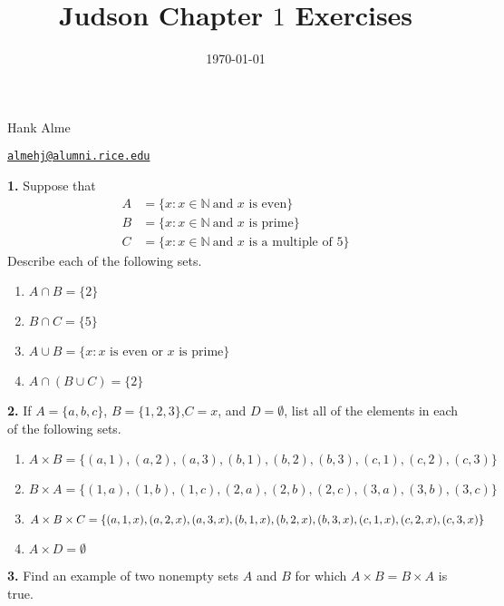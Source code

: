 \documentclass[12pt]{amsart}
\title{Judson Chapter $1$ Exercises}
\date{\today}
\newenvironment{statement}[1]{\smallskip\noindent\color[rgb]{1.00,0.00,0.50} {\bf #1.}}{}
\theoremstyle{definition}
\theoremstyle{remark}
\newcommand{\BN}{\mathbb N}
\begin{document}
\maketitle

\vspace*{-0.25in}
\centerline{Hank Alme}
\centerline{\href{mailto:almehj@alumni.rice.edu}{{\tt almehj@alumni.rice.edu}}}
\vspace*{0.15in}


\begin{statement}{1}
  Suppose that
  \begin{align*}
    A &= \{ x : x \in \BN\  \text{and $x$ is even} \} \\
    B &= \{ x : x \in \BN\  \text{and $x$ is prime} \} \\
    C &= \{ x : x \in \BN\  \text{and $x$ is a multiple of $5$} \}
  \end{align*}
  Describe each of the following sets.
  
\end{statement}
\begin{enumerate}[label=(\alph*)]
\item $A \cap B = \{2\}$
\item $B \cap C = \{5\}$
\item $A \cup B = \{ x : \text{$x$ is even or $x$ is prime} \}$
\item $A \cap (B \cup C) = \{2\}$
\end{enumerate}


\begin{statement}{2}
  If $A = \{a,b,c\}$, $B = \{1,2,3\}$,$C= {x}$, and $D = \emptyset$,
  list all of the elements in each of the following sets.
\end{statement}

\begin{enumerate}[label=(\alph*)]
  \item $A \times B =
    \{(a,1),(a,2),(a,3),(b,1),(b,2),(b,3),(c,1),(c,2),(c,3)\} $
  \item $B \times A = \{
    (1,a),(1,b),(1,c),(2,a),(2,b),(2,c),(3,a),(3,b),(3,c) \}$
  \item $A \times B \times C = \{(a,1,x),(a,2,x),(a,3,x),(b,1,x),(b,2,x),(b,3,x), \\
    (c,1,x),(c,2,x),(c,3,x)\} $
      \item $A \times D = \emptyset$
\end{enumerate}


\begin{statement}{3}
  Find an example of two nonempty sets $A$ and $B$ for which $A \times B = B \times A$ is true.
\end{statement}
\end{document}
